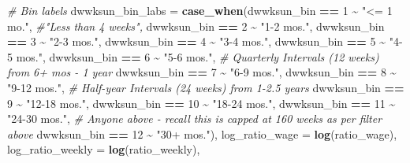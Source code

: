 \documentclass[
]{article}
\newenvironment{Shaded}{\begin{snugshade}}{\end{snugshade}}
\newcommand{\AttributeTok}[1]{\textcolor[rgb]{0.13,0.29,0.53}{#1}}
\newcommand{\CommentTok}[1]{\textcolor[rgb]{0.56,0.35,0.01}{\textit{#1}}}
\newcommand{\DecValTok}[1]{\textcolor[rgb]{0.00,0.00,0.81}{#1}}
\newcommand{\FunctionTok}[1]{\textcolor[rgb]{0.13,0.29,0.53}{\textbf{#1}}}
\newcommand{\NormalTok}[1]{#1}
\newcommand{\SpecialCharTok}[1]{\textcolor[rgb]{0.81,0.36,0.00}{\textbf{#1}}}
\newcommand{\StringTok}[1]{\textcolor[rgb]{0.31,0.60,0.02}{#1}}
\begin{document}
\begin{Shaded}
\begin{Highlighting}[]
         \CommentTok{\# Bin labels}
         \AttributeTok{dwwksun\_bin\_labs =} \FunctionTok{case\_when}\NormalTok{(dwwksun\_bin }\SpecialCharTok{==} \DecValTok{1} \SpecialCharTok{\textasciitilde{}} \StringTok{"\textless{}= 1 mo."}\NormalTok{, }\CommentTok{\#"Less than 4 weeks",}
\NormalTok{                                 dwwksun\_bin }\SpecialCharTok{==} \DecValTok{2} \SpecialCharTok{\textasciitilde{}} \StringTok{"1{-}2 mos."}\NormalTok{,}
\NormalTok{                                 dwwksun\_bin }\SpecialCharTok{==} \DecValTok{3} \SpecialCharTok{\textasciitilde{}} \StringTok{"2{-}3 mos."}\NormalTok{,}
\NormalTok{                                 dwwksun\_bin }\SpecialCharTok{==} \DecValTok{4} \SpecialCharTok{\textasciitilde{}} \StringTok{"3{-}4 mos."}\NormalTok{, }
\NormalTok{                                 dwwksun\_bin }\SpecialCharTok{==} \DecValTok{5} \SpecialCharTok{\textasciitilde{}} \StringTok{"4{-}5 mos."}\NormalTok{,}
\NormalTok{                                 dwwksun\_bin }\SpecialCharTok{==} \DecValTok{6} \SpecialCharTok{\textasciitilde{}} \StringTok{"5{-}6 mos."}\NormalTok{,}
                                 \CommentTok{\# Quarterly Intervals (12 weeks) from 6+ mos {-} 1 year}
\NormalTok{                                 dwwksun\_bin }\SpecialCharTok{==} \DecValTok{7} \SpecialCharTok{\textasciitilde{}} \StringTok{"6{-}9 mos."}\NormalTok{,}
\NormalTok{                                 dwwksun\_bin }\SpecialCharTok{==} \DecValTok{8} \SpecialCharTok{\textasciitilde{}} \StringTok{"9{-}12 mos."}\NormalTok{, }
                                 \CommentTok{\# Half{-}year Intervals (24 weeks) from 1{-}2.5 years}
\NormalTok{                                 dwwksun\_bin }\SpecialCharTok{==} \DecValTok{9} \SpecialCharTok{\textasciitilde{}} \StringTok{"12{-}18 mos."}\NormalTok{, }
\NormalTok{                                 dwwksun\_bin }\SpecialCharTok{==} \DecValTok{10} \SpecialCharTok{\textasciitilde{}} \StringTok{"18{-}24 mos."}\NormalTok{, }
\NormalTok{                                 dwwksun\_bin }\SpecialCharTok{==} \DecValTok{11} \SpecialCharTok{\textasciitilde{}} \StringTok{"24{-}30 mos."}\NormalTok{, }
                                 \CommentTok{\# Anyone above {-} recall this is capped at 160 weeks as per filter above}
\NormalTok{                                 dwwksun\_bin }\SpecialCharTok{==} \DecValTok{12} \SpecialCharTok{\textasciitilde{}} \StringTok{"30+ mos."}\NormalTok{),}
         \AttributeTok{log\_ratio\_wage =} \FunctionTok{log}\NormalTok{(ratio\_wage),}
         \AttributeTok{log\_ratio\_weekly =} \FunctionTok{log}\NormalTok{(ratio\_weekly),}

\end{Highlighting}
\end{Shaded}
\end{document}

